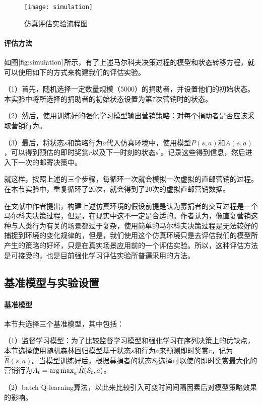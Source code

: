 \begin{figure}[htbp]
\centering
\texttt{[image: simulation]}
\caption{仿真评估实验流程图}
\label{fig:simulation}
\end{figure}

\paragraph{评估方法}
如图$\ref{fig:simulation}$所示，有了上述马尔科夫决策过程的模型和状态转移方程，就可以使用如下的方式来构建我们的评估实验。

（1）首先，随机选择一定数量规模（5000）的捐助者，并设置他们的初始状态。本实验中将所选择的捐助者的初始状态设置为第7次营销时的状态。

（2）然后，使用训练好的强化学习模型输出营销策略：对每个捐助者是否应该采取营销行为。

（3）最后，将状态$s$和策略行为$a$代入仿真环境中，使用模型$P(s,a)$和$A(s,a)$，可以得到预估的即时奖赏$r$以及下一时刻的状态$s^{'}$。记录这些得到信息，然后进入下一次的邮寄决策中。

就这样，按照上述的三个步骤，每循环一次就会模拟一次虚拟的直邮营销的过程。在本节实验中，重复循环了20次，就会得到了20次的虚拟直邮营销数据。

在文献\citep{pednault2002sequential}中作者提出，构建上述仿真环境的假设前提是认为募捐者的交互过程是一个马尔科夫决策过程，但是，在现实中这不一定是合适的。作者认为，像直复营销这种与人类行为有关的场景都过于复杂，使用简单的马尔科夫决策过程是无法较好的捕捉到环境的变化规律的，但是，我们使用这个仿真环境只是去评估我们的模型所产生的策略的好坏，只是在真实场景应用前的一个评估实验。所以，这种评估方法是可接受的，也是目前强化学习评估实验所普遍采用的方法。

\subsection{基准模型与实验设置}
\paragraph{基准模型}
本节共选择三个基准模型，其中包括：

（1）监督学习模型：为了比较监督学习模型和强化学习在序列决策上的优缺点，本节选择使用随机森林回归模型基于状态$s$和行为$a$来预测即时奖赏$r$，记为$\hat{R}(s,a)$。当模型训练好后，根据募捐者的状态$S_{t}$选择可以使的即时奖赏最大化的营销行为$A_{t}=\operatorname*{arg\,max}_{a} \hat{R}(S_{t},a)$。

（2）batch Q-learning算法\citep{pednault2002sequential}，以此来比较引入可变时间间隔因素后对模型策略效果的影响。

